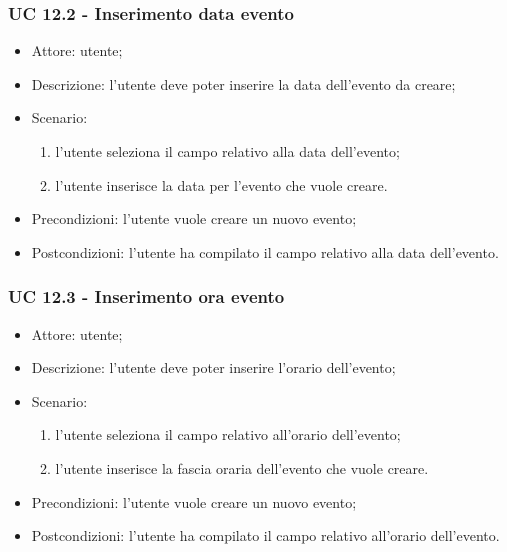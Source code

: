 \subsubsection{UC 12.2 - Inserimento data evento} \label{sec: UC 12.2}
\begin{itemize}
    \item Attore: utente;
    \item Descrizione: l'utente deve poter inserire la data dell'evento da creare;
    \item Scenario:
        \begin{enumerate}
        \item l'utente seleziona il campo relativo alla data dell'evento;
        \item l'utente inserisce la data per l'evento che vuole creare.
        \end{enumerate}
    
    \item Precondizioni: l'utente vuole creare un nuovo evento;
    \item Postcondizioni: l'utente ha compilato il campo relativo alla data dell'evento.
\end{itemize}


\subsubsection{UC 12.3 - Inserimento ora evento} \label{sec: UC 12.3}
\begin{itemize}
    \item Attore: utente;
    \item Descrizione: l'utente deve poter inserire l'orario dell'evento;
    \item Scenario:
        \begin{enumerate}
        \item l'utente seleziona il campo relativo all'orario dell'evento;
        \item l'utente inserisce la fascia oraria dell'evento che vuole creare.
        \end{enumerate}
    
    \item Precondizioni: l'utente vuole creare un nuovo evento;
    \item Postcondizioni: l'utente ha compilato il campo relativo all'orario dell'evento.
\end{itemize}

